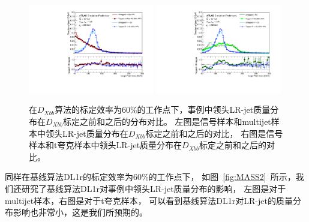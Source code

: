 \begin{figure}[h]
  \begin{center}
    \includegraphics[width=0.49\textwidth]{figuresXbb/efficiencies/dijetcomp_all_largeRjet_jetjet_JZ_mass_inclusive_discf025zoom.pdf}
    \includegraphics[width=0.49\textwidth]{figuresXbb/efficiencies/ttcomp_all_largeRjet_tt_mass_inclusive_discf025zoom.pdf}
  \end{center}
  \caption{
 在$D_{Xbb}$算法的标定效率为60\%的工作点下，事例中领头LR-jet质量分布在$D_{Xbb}$标定之前和之后的分布对比。
 左图是信号样本和multijet样本中领头LR-jet质量分布在$D_{Xbb}$标定之前和之后的对比，
右图是信号样本和t夸克样本中领头LR-jet质量分布在$D_{Xbb}$标定之前和之后的对比。
}
  \label{fig:MASS1}
\end{figure}


同样在基线算法DL1r的标定效率为60\%的工作点下，
如图~\ref{fig:MASS2}~所示，我们还研究了基线算法DL1r对事例中领头LR-jet质量分布的影响，
左图是对于multijet样本，右图是对于t夸克样本，
可以看到基线算法DL1r对LR-jet的质量分布影响也非常小，这是我们所预期的。

